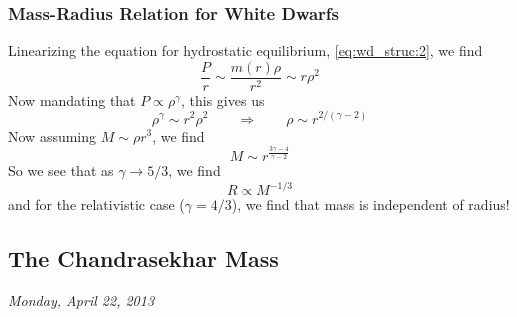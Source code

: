 \documentclass[10pt]{article}
\numberwithin{equation}{section}
\begin{document}
		\subsubsection{Mass-Radius Relation for White Dwarfs} %
		\label{ssub:mass_radius_relation_for_white_dwarfs}
			Linearizing the equation for hydrostatic equilibrium, \eqref{eq:wd_struc:2}, we find
			\begin{equation}
				\label{eq:wd_struc:34} \frac{P}{r}\sim \frac{m(r)\rho}{r^2}\sim r\rho^2
			\end{equation}
			Now mandating that $P\propto \rho^\gamma$, this gives us
			\begin{equation}
				\label{eq:wd_struc:35} \rho^\gamma\sim r^2\rho^2 \qquad \Rightarrow \qquad \rho\sim r^{2/(\gamma-2)}
			\end{equation}
			Now assuming $M\sim \rho r^3$, we find
			\begin{equation}
				\label{eq:wd_struc:36} M\sim r^{\frac{3\gamma - 4}{\gamma - 2}}
			\end{equation}
			So we see that as $\gamma\to 5/3$, we find
			\begin{equation}
				\label{eq:eq:wd_struc:37} R\propto M^{-1/3}
			\end{equation}
			and for the relativistic case ($\gamma = 4/3$), we find that mass is independent of radius!
		\subsection{The Chandrasekhar Mass} %
		\label{sub:the_chandrasekhar_mass}
		\emph{Monday, April 22, 2013}\\
		
\end{document}
